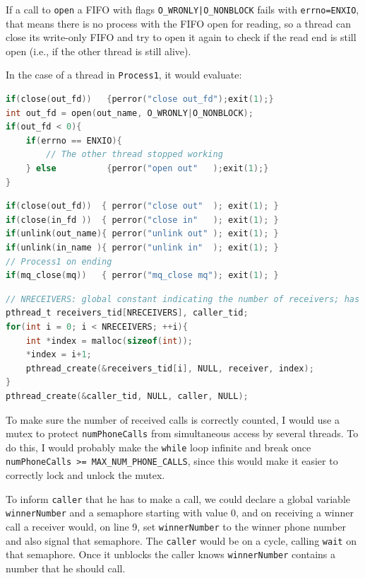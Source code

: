 \documentclass{sope}
\begin{document}
If a call to \texttt{open} a FIFO with flags \texttt{O\_WRONLY|O\_NONBLOCK} fails with \texttt{errno=ENXIO}, that means there is no process with the FIFO open for reading, so a thread can close its write-only FIFO and try to open it again to check if the read end is still open (i.e., if the other thread is still alive).

In the case of a thread in \texttt{Process1}, it would evaluate:
\begin{lstlisting}[language=C,basicstyle=\ttfamily\small]
if(close(out_fd))   {perror("close out_fd");exit(1);}
int out_fd = open(out_name, O_WRONLY|O_NONBLOCK);
if(out_fd < 0){
    if(errno == ENXIO){
        // The other thread stopped working
    } else          {perror("open out"   );exit(1);}
}
\end{lstlisting}

\begin{lstlisting}[language=C,basicstyle=\ttfamily\small]
if(close(out_fd))  { perror("close out"  ); exit(1); }
if(close(in_fd ))  { perror("close in"   ); exit(1); }
if(unlink(out_name){ perror("unlink out" ); exit(1); }
if(unlink(in_name ){ perror("unlink in"  ); exit(1); }
// Process1 on ending
if(mq_close(mq))   { perror("mq_close mq"); exit(1); }
\end{lstlisting}

\newpage
\begin{lstlisting}[language=C,basicstyle=\ttfamily\small]
// NRECEIVERS: global constant indicating the number of receivers; has value 10
pthread_t receivers_tid[NRECEIVERS], caller_tid;
for(int i = 0; i < NRECEIVERS; ++i){
    int *index = malloc(sizeof(int));
    *index = i+1;
    pthread_create(&receivers_tid[i], NULL, receiver, index);
}
pthread_create(&caller_tid, NULL, caller, NULL);
\end{lstlisting}

To make sure the number of received calls is correctly counted, I would use a mutex to protect \texttt{numPhoneCalls} from simultaneous access by several threads. To do this, I would probably make the \texttt{while} loop infinite and break once \texttt{numPhoneCalls >= MAX\_NUM\_PHONE\_CALLS}, since this would make it easier to correctly lock and unlock the mutex.

To inform \texttt{caller} that he has to make a call, we could declare a global variable \texttt{winnerNumber} and a semaphore starting with value 0, and on receiving a winner call a receiver would, on line 9, set \texttt{winnerNumber} to the winner phone number and also signal that semaphore. The \texttt{caller} would be on a cycle, calling \texttt{wait} on that semaphore. Once it unblocks the caller knows \texttt{winnerNumber} contains a number that he should call.
\end{document}
